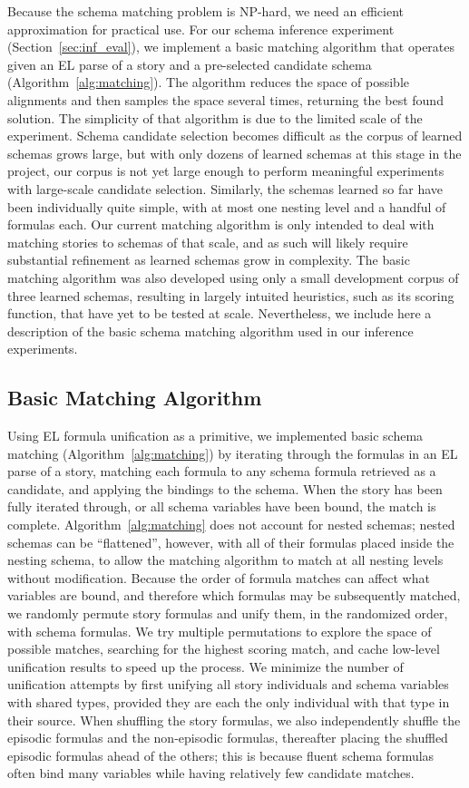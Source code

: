 Because the schema matching problem is $\mathrm{NP}$-hard, we need an efficient approximation for practical use. For our schema inference experiment (Section~\ref{sec:inf_eval}), we implement a basic matching algorithm that operates given an EL parse of a story and a pre-selected candidate schema (Algorithm~\ref{alg:matching}). The algorithm reduces the space of possible alignments and then samples the space several times, returning the best found solution. The simplicity of that algorithm is due to the limited scale of the experiment. Schema candidate selection becomes difficult as the corpus of learned schemas grows large, but with only dozens of learned schemas at this stage in the project, our corpus is not yet large enough to perform meaningful experiments with large-scale candidate selection. Similarly, the schemas learned so far have been individually quite simple, with at most one nesting level and a handful of formulas each. Our current matching algorithm is only intended to deal with matching stories to schemas of that scale, and as such will likely require substantial refinement as learned schemas grow in complexity. The basic matching algorithm was also developed using only a small development corpus of three learned schemas, resulting in largely intuited heuristics, such as its scoring function, that have yet to be tested at scale. Nevertheless, we include here a description of the basic schema matching algorithm used in our inference experiments.

\subsection{Basic Matching Algorithm}
Using EL formula unification as a primitive, we implemented basic schema matching (Algorithm~\ref{alg:matching}) by iterating through the formulas in an EL parse of a story, matching each formula to any schema formula retrieved as a candidate, and applying the bindings to the schema. When the story has been fully iterated through, or all schema variables have been bound, the match is complete.
Algorithm~\ref{alg:matching} does not account for nested schemas; nested schemas can be ``flattened'', however, with all of their formulas placed inside the nesting schema, to allow the matching algorithm to match at all nesting levels without modification.
Because the order of formula matches can affect what variables are bound, and therefore which formulas may be subsequently matched, we randomly permute story formulas and unify them, in the randomized order, with schema formulas.
We try multiple permutations to explore the space of possible matches, searching for the highest scoring match, and cache low-level unification results to speed up the process.
We minimize the number of unification attempts by first unifying all story individuals and schema variables with shared types, provided they are each the only individual with that type in their source.
When shuffling the story formulas, we also independently shuffle the episodic formulas and the non-episodic formulas, thereafter placing the shuffled episodic formulas ahead of the others; this is because fluent schema formulas often bind many variables while having relatively few candidate matches.

